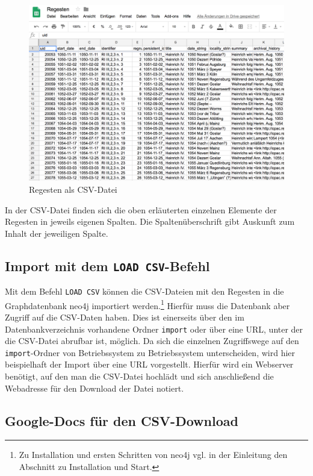 \documentclass[ngerman,]{scrreprt}
\begin{document}
\begin{figure}
\centering
\includegraphics{Bilder/RI2Graph/ReggH4-Regestentabelle.png}
\caption{Regesten als CSV-Datei}
\end{figure}

In der CSV-Datei finden sich die oben erläuterten einzelnen Elemente der Regesten in jeweils eigenen Spalten. Die Spaltenüberschrift gibt Auskunft zum Inhalt der jeweiligen Spalte.

\subsection{\texorpdfstring{Import mit dem \texttt{LOAD\ CSV}-Befehl}{Import mit dem LOAD CSV-Befehl}}\label{import-mit-dem-load-csv-befehl}

Mit dem Befehl \texttt{LOAD\ CSV} können die CSV-Dateien mit den Regesten in die Graphdatenbank neo4j importiert werden.\footnote{Zu Installation und ersten Schritten von neo4j vgl. in der Einleitung den Abschnitt zu Installation und Start.} Hierfür muss die Datenbank aber Zugriff auf die CSV-Daten haben. Dies ist einerseits über den im Datenbankverzeichnis vorhandene Ordner \texttt{import} oder über eine URL, unter der die CSV-Datei abrufbar ist, möglich. Da sich die einzelnen Zugriffswege auf den \texttt{import}-Ordner von Betriebssystem zu Betriebssystem unterscheiden, wird hier beispielhaft der Import über eine URL vorgestellt. Hierfür wird ein Webserver benötigt, auf den man die CSV-Datei hochlädt und sich anschließend die Webadresse für den Download der Datei notiert.

\subsection{Google-Docs für den CSV-Download}\label{google-docs-fuxfcr-den-csv-download}
\end{document}

